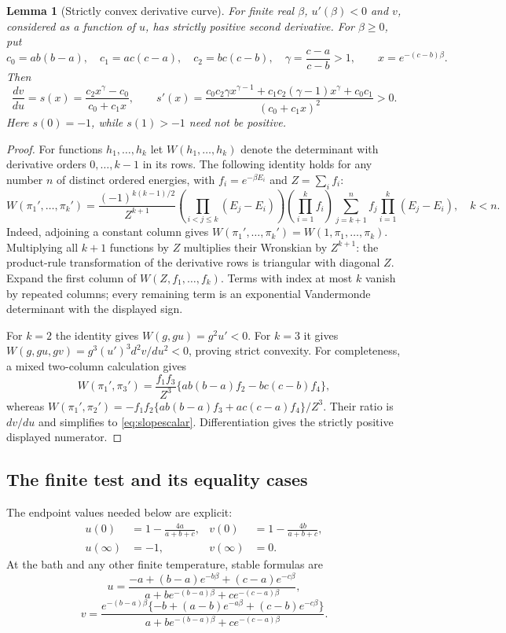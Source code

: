 \documentclass[11pt]{article}
\newtheorem{lemma}{Lemma}
\begin{document}
\begin{lemma}[Strictly convex derivative curve]\label{lem:convexcurve}
For finite real $\beta$, $u'(\beta)<0$ and $v$, considered as a function
of $u$, has strictly positive second derivative. For $\beta\geq0$, put
\[
c_0=ab(b-a),\quad c_1=ac(c-a),\quad c_2=bc(c-b),\quad
\gamma=\frac{c-a}{c-b}>1,\qquad x=e^{-(c-b)\beta}.
\]
Then
\begin{equation}\label{eq:slopescalar}
\frac{dv}{du}=s(x)=\frac{c_2x^\gamma-c_0}{c_0+c_1x},\qquad
s'(x)=\frac{c_0c_2\gamma x^{\gamma-1}
+c_1c_2(\gamma-1)x^\gamma+c_0c_1}{(c_0+c_1x)^2}>0.
\end{equation}
Here $s(0)=-1$, while $s(1)>-1$ need not be positive.
\end{lemma}
\begin{proof}
For functions $h_1,\ldots,h_k$ let $W(h_1,\ldots,h_k)$ denote the
determinant with derivative orders $0,\ldots,k-1$ in its rows.
The following identity holds for any number $n$ of distinct ordered energies,
with $f_i=e^{-\beta E_i}$ and $Z=\sum_i f_i$:
\begin{equation}\label{eq:gibbswronskian}
W(\pi_1',\ldots,\pi_k')=
\frac{(-1)^{k(k-1)/2}}{Z^{k+1}}
\left(\prod_{i<j\leq k}(E_j-E_i)\right)
\left(\prod_{i=1}^k f_i\right)
\sum_{j=k+1}^n f_j\prod_{i=1}^k(E_j-E_i),\quad k<n.
\end{equation}
Indeed, adjoining a constant column gives
$W(\pi_1',\ldots,\pi_k')=W(1,\pi_1,\ldots,\pi_k)$.
Multiplying all $k+1$ functions by $Z$ multiplies their Wronskian by
$Z^{k+1}$: the product-rule transformation of the derivative rows is triangular
with diagonal $Z$. Expand the first column of $W(Z,f_1,\ldots,f_k)$.
Terms with index at most $k$ vanish by repeated columns; every remaining term
is an exponential Vandermonde determinant with the displayed sign.

For $k=2$ the identity gives $W(g,gu)=g^2u'<0$.
For $k=3$ it gives
$W(g,gu,gv)=g^3(u')^3d^2v/du^2<0$, proving strict convexity.
For completeness, a mixed two-column calculation gives
\[
W(\pi_1',\pi_3')=
\frac{f_1f_3}{Z^3}\{ab(b-a)f_2-bc(c-b)f_4\},
\]
whereas
$W(\pi_1',\pi_2')=-f_1f_2\{ab(b-a)f_3+ac(c-a)f_4\}/Z^3$.
Their ratio is $dv/du$ and simplifies to \eqref{eq:slopescalar}.
Differentiation gives the strictly positive displayed numerator.
\end{proof}

\subsection{The finite test and its equality cases}
The endpoint values needed below are explicit:
\begin{align*}
u(0)&=1-\frac{4a}{a+b+c},&v(0)&=1-\frac{4b}{a+b+c},\\
u(\infty)&=-1,&v(\infty)&=0.
\end{align*}
At the bath and any other finite temperature, stable formulas are
\[
u=\frac{-a+(b-a)e^{-b\beta}+(c-a)e^{-c\beta}}
{a+be^{-(b-a)\beta}+ce^{-(c-a)\beta}},
\]
\[
v=\frac{e^{-(b-a)\beta}\{-b+(a-b)e^{-a\beta}+(c-b)e^{-c\beta}\}}
{a+be^{-(b-a)\beta}+ce^{-(c-a)\beta}}.
\]
\end{document}
